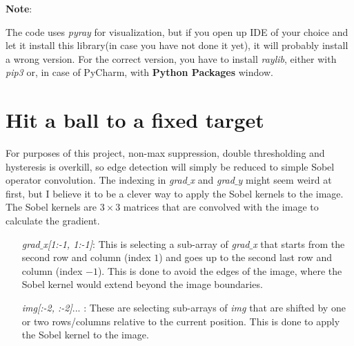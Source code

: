 \documentclass{article}
\begin{document}
	\textbf{Note}: 
	
	The code uses \textit{pyray} for visualization, but if you open up IDE of your choice and let it install this library(in case you have not done it yet), it will probably install a wrong version. For the correct version, you have to install \textit{raylib}, either with \textit{pip3} or, in case of PyCharm, with \textbf{Python Packages} window.
	
	\newpage
	\section{Hit a ball to a fixed target \CircPipe}
	
	For purposes of this project, non-max suppression, double thresholding and hysteresis is overkill, so edge detection will simply be reduced to simple Sobel operator convolution. The indexing in \textit{grad$\_$x} and \textit{grad$\_$y} might seem weird at first, but I believe it to be a clever way to apply the Sobel kernels to the image. The Sobel kernels are $3 \times 3$ matrices that are convolved with the image to calculate the gradient.
	\begin{itemize}
		\item[\textit{grad$\_$x[1:-1, 1:-1]}:] This is selecting a sub-array of \textit{grad$\_$x} that starts from the second row and column (index $1$) and goes up to the second last row and column (index $-1$). This is done to avoid the edges of the image, where the Sobel kernel would extend beyond the image boundaries.
		\item[\textit{img[:-2, :-2]}... :] These are selecting sub-arrays of \textit{img} that are shifted by one or two rows/columns relative to the current position. This is done to apply the Sobel kernel to the image.
	\end{itemize}	
		
\end{document}
